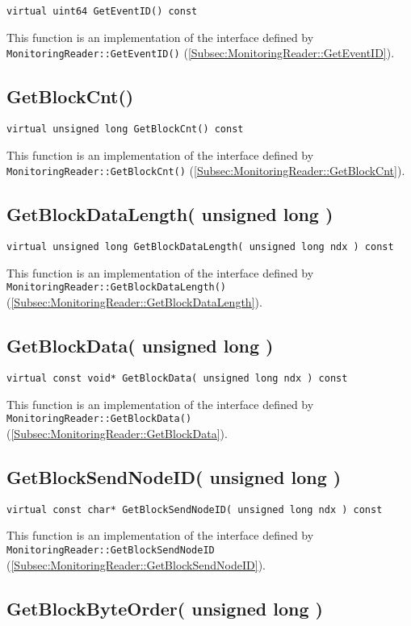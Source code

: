\documentclass[a4paper,twoside]{article}
\begin{document}
\texttt{virtual uint64 GetEventID() const}

This function is an implementation of the interface defined by \texttt{MonitoringReader::GetEventID()} (\ref{Subsec:MonitoringReader::GetEventID}).


\subsection{GetBlockCnt()}

\texttt{virtual unsigned long GetBlockCnt() const}

This function is an implementation of the interface defined by \texttt{MonitoringReader::GetBlockCnt()} (\ref{Subsec:MonitoringReader::GetBlockCnt}).


\subsection{GetBlockDataLength( unsigned long )}

\texttt{virtual unsigned long GetBlockDataLength( unsigned long ndx ) const}

This function is an implementation of the interface defined by \texttt{MonitoringReader::GetBlockDataLength()} (\ref{Subsec:MonitoringReader::GetBlockDataLength}).


\subsection{GetBlockData( unsigned long )}

\texttt{virtual const void* GetBlockData( unsigned long ndx ) const}

This function is an implementation of the interface defined by \texttt{MonitoringReader::GetBlockData()} (\ref{Subsec:MonitoringReader::GetBlockData}).


\subsection{GetBlockSendNodeID( unsigned long )}

\texttt{virtual const char* GetBlockSendNodeID( unsigned long ndx ) const}

This function is an implementation of the interface defined by \texttt{MonitoringReader::GetBlockSendNodeID} (\ref{Subsec:MonitoringReader::GetBlockSendNodeID}).


\subsection{GetBlockByteOrder( unsigned long )}
\end{document}
